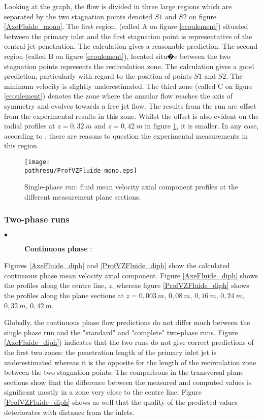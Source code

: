 \documentclass[a4paper,twoside,12pt]{article}
\newcommand{\pathresu}{./FIGURES}
\begin{document}
\noindent
Looking at the graph, the flow is divided in three large regions which are separated by the two stagnation points denoted $S1$ and $S2$ on figure \ref{AxeFluide_mono}. The first region, (called A on figure \ref{ecoulement}) situated between the primary inlet and the first stagnation point is representative of the central jet penetration. The calculation gives a reasonable prediction. The second region (called B on figure \ref{ecoulement}), located  situ�e between the two stagnation points represents the recirculation zone. The calculation gives a good prediction, particularly with regard to the position of points $S1$ and $S2$. The minimum velocity is slightly underestimated. The third zone (called C on figure \ref{ecoulement}) denotes the zone where the annular flow reaches the axis of symmetry and evolves towards a free jet flow. The results from the run are offset from the experimental results in this zone. Whilst the offset is also evident on the radial profiles at $z=0,32~m$ and $z=0,42~m$ in figure \ref{ProfVZFluide_mono}, it is smaller. In any case, according to \cite{Rap3}, there are reasons to question the experimental measurements in this region.

\begin{figure}[h]
   \centerline{\texttt{[image: \\pathresu/ProfVZFluide\_mono.eps]}}
   \caption{Single-phase run: fluid mean velocity axial component profiles at the different measurement plane sections.}
   \label{ProfVZFluide_mono}
\end{figure}

\clearpage

\subsubsection{Two-phase runs}

\begin{description}
   \item[$\bullet$] \textbf{Continuous phase} :
\end{description}

Figures \ref{AxeFluide_diph} and \ref{ProfVZFluide_diph} show the calculated continuous phase mean velocity axial component. Figure \ref{AxeFluide_diph} shows the profiles along the centre line, $z$, whereas figure \ref{ProfVZFluide_diph} shows the profiles along the plane sections at $z = 0,003~m$, $0,08~m$, $0,16~m$, $0,24~m$, $0,32~m$, $0,42~m$.

\noindent
Globally, the continuous phase flow predictions do not differ much between the single phase run and the "standard" and "complete" two-phase runs. Figure \ref{AxeFluide_diph}) indicates that the two runs do not give correct predictions of the first two zones: the penetration length of the primary inlet jet is underestimated whereas it is the opposite for the length of the recirculation zone between the two stagnation points. The comparisons in the transversal plane sections show that the difference between the measured and computed values is significant mostly in a zone very close to the centre line. Figure \ref{ProfVZFluide_diph} shows as well that the quality of the predicted values deteriorates with distance from the inlets.
\end{document}
